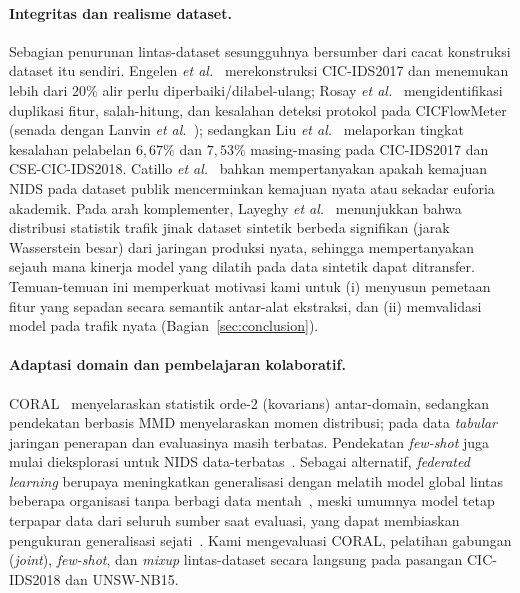 \documentclass[11pt,a4paper]{article}
\begin{document}
\paragraph{Integritas dan realisme dataset.} Sebagian penurunan lintas-dataset
sesungguhnya bersumber dari cacat konstruksi dataset itu sendiri. Engelen
\emph{et al.}~\cite{engelen} merekonstruksi CIC-IDS2017 dan menemukan lebih dari
$20\%$ alir perlu diperbaiki/dilabel-ulang; Rosay \emph{et al.}~\cite{rosay}
mengidentifikasi duplikasi fitur, salah-hitung, dan kesalahan deteksi protokol
pada CICFlowMeter (senada dengan Lanvin \emph{et al.}~\cite{lanvin}); sedangkan
Liu \emph{et al.}~\cite{liu} melaporkan tingkat
kesalahan pelabelan $6{,}67\%$ dan $7{,}53\%$ masing-masing pada CIC-IDS2017 dan
CSE-CIC-IDS2018. Catillo \emph{et al.}~\cite{catillo} bahkan mempertanyakan
apakah kemajuan NIDS pada dataset publik mencerminkan kemajuan nyata atau sekadar
euforia akademik. Pada arah komplementer, Layeghy \emph{et al.}~\cite{layeghy}
menunjukkan bahwa distribusi statistik trafik jinak dataset sintetik berbeda
signifikan (jarak Wasserstein besar) dari jaringan produksi nyata, sehingga
mempertanyakan sejauh mana kinerja model yang dilatih pada data sintetik dapat
ditransfer. Temuan-temuan ini memperkuat motivasi kami untuk (i) menyusun
pemetaan fitur yang sepadan secara semantik antar-alat ekstraksi, dan (ii)
memvalidasi model pada trafik nyata (Bagian~\ref{sec:conclusion}).

\paragraph{Adaptasi domain dan pembelajaran kolaboratif.} CORAL~\cite{coral}
menyelaraskan statistik orde-2 (kovarians) antar-domain, sedangkan pendekatan
berbasis MMD menyelaraskan momen distribusi; pada data \emph{tabular} jaringan
penerapan dan evaluasinya masih terbatas. Pendekatan \emph{few-shot} juga mulai
dieksplorasi untuk NIDS data-terbatas~\cite{fewshot}. Sebagai alternatif,
\emph{federated learning} berupaya meningkatkan generalisasi dengan melatih model
global lintas beberapa organisasi tanpa berbagi data
mentah~\cite{nidsfgpa,popoola,bertoli,agrawal}, meski
umumnya model tetap terpapar data dari seluruh sumber saat evaluasi, yang dapat
membiaskan pengukuran generalisasi sejati~\cite{cantone}. Kami mengevaluasi CORAL,
pelatihan gabungan (\emph{joint}), \emph{few-shot}, dan \emph{mixup}
lintas-dataset secara langsung pada pasangan CIC-IDS2018 dan UNSW-NB15.

\ifadversarial
\end{document}
